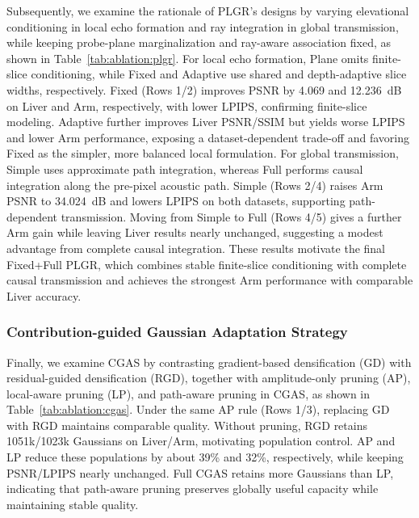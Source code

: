 Subsequently, we examine the rationale of PLGR's designs by
varying elevational conditioning in local echo formation and ray integration
in global transmission, while keeping probe-plane marginalization and
ray-aware association fixed, as shown in Table~\ref{tab:ablation:plgr}.
For local echo formation, Plane omits finite-slice conditioning, while Fixed
and Adaptive use shared and depth-adaptive slice widths, respectively.
Fixed (Rows 1/2) improves PSNR by 4.069 and 12.236~dB on Liver and Arm,
respectively, with lower LPIPS, confirming finite-slice modeling.
Adaptive further improves Liver PSNR/SSIM but
yields worse LPIPS and lower Arm performance, exposing a dataset-dependent
trade-off and favoring Fixed as the simpler, more balanced local formulation.
For global transmission, Simple uses approximate path integration, whereas
Full performs causal integration along the pre-pixel acoustic path.
Simple (Rows 2/4) raises Arm PSNR to 34.024~dB and lowers LPIPS on both
datasets, supporting path-dependent transmission.
Moving from Simple to Full (Rows 4/5) gives a further Arm gain
while leaving Liver results nearly unchanged, suggesting a modest advantage
from complete causal integration. 
These results motivate the final Fixed+Full PLGR, which combines
stable finite-slice conditioning with complete causal transmission and
achieves the strongest Arm performance with comparable Liver accuracy.





\subsubsection{Contribution-guided Gaussian Adaptation Strategy}

Finally, we examine CGAS by contrasting gradient-based densification (GD) with
residual-guided densification (RGD), together with amplitude-only pruning
(AP), local-aware pruning (LP), and path-aware pruning in CGAS, as shown
in Table~\ref{tab:ablation:cgas}. Under the same AP rule (Rows 1/3), replacing
GD with RGD maintains comparable quality.
Without pruning, RGD retains 1051k/1023k Gaussians on Liver/Arm, motivating
population control. AP and LP reduce these populations by
about 39\% and 32\%, respectively, while keeping PSNR/LPIPS nearly unchanged.
Full CGAS retains more Gaussians than LP, indicating that
path-aware pruning preserves globally useful capacity while maintaining stable
quality.


